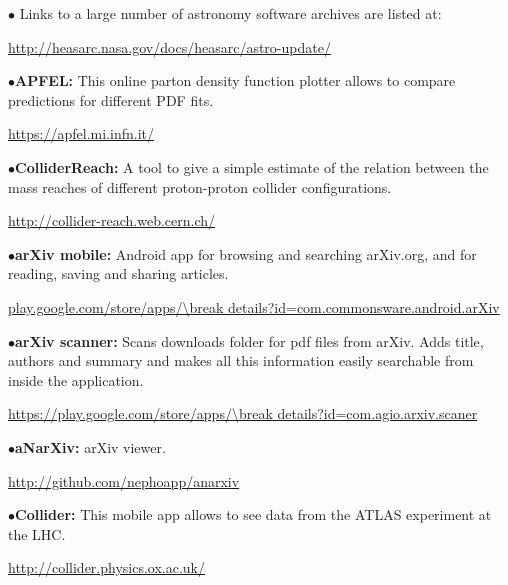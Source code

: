 \medskip

\item{$\bullet$}
Links to a large number of astronomy software archives are listed at:
	\item{}\qquad\url{http://heasarc.nasa.gov/docs/heasarc/astro-update/} 

\medskip

\medskip

\item{$\bullet$}{\bf APFEL:} 
This online parton density function plotter allows to compare predictions for different PDF fits.
	\item{}\qquad\url{https://apfel.mi.infn.it/}

\medskip

\item{$\bullet$}{\bf ColliderReach:}
A tool to give a simple estimate of the relation between the mass reaches of different proton-proton collider configurations.
	\item{}\qquad\url{http://collider-reach.web.cern.ch/}

\medskip

\medskip

\item{$\bullet$}{\bf arXiv mobile:}
Android app for browsing and searching arXiv.org, and for reading, saving and sharing articles.
	\item{}\qquad\url{play.google.com/store/apps/\break details?id=com.commonsware.android.arXiv}

\medskip

\item{$\bullet$}{\bf arXiv scanner:}
Scans downloads folder for pdf files from arXiv. Adds title, authors and summary and makes all this information easily searchable from inside the application.
	\item{}\qquad\url{https://play.google.com/store/apps/\break details?id=com.agio.arxiv.scaner}

\medskip

\item{$\bullet$}{\bf aNarXiv:}
arXiv viewer.
        \item{}\qquad\url{http://github.com/nephoapp/anarxiv}

\medskip

\item{$\bullet$}{\bf Collider:}
This mobile app allows to see data from the ATLAS experiment at the LHC.
	\item{}\qquad\url{http://collider.physics.ox.ac.uk/}

